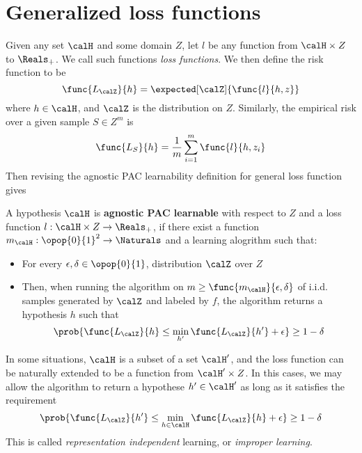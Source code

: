 \section{Generalized loss functions}
Given any set \(\calH\) and some domain \(Z\), let \(l\) be any function from \(\calH \times Z\) to \(\Reals_+\). We call such functions \textit{loss functions}. We then define the risk function to be
\begin{equation*}
    \func{L_{\calZ}}{h} = \expected[\calZ]{\func{l}{h,z}}
\end{equation*}
where \(h \in \calH\), and \(\calZ\) is the distribution on \(Z\). Similarly, the empirical risk over a given sample \(S \in Z^m\) is 
\begin{equation*}
    \func{L_S}{h} = \dfrac{1}{m} \sum_{i = 1}^m \func{l}{h,z_i}
\end{equation*}
Then revising the agnostic PAC learnability definition for general loss function gives 
\begin{definition}
    A hypothesis \(\calH\) is \textbf{agnostic PAC learnable} with respect to \(Z\) and a loss function \(l:\calH \times Z \to \Reals_+\), if there exist a function \(m_{\calH} : \opop{0}{1}^2 \to \Naturals\) and a learning alogrithm such that:
    \begin{itemize}
        \item For every \(\epsilon,\delta \in \opop{0}{1}\), distribution \(\calZ\) over \(Z\)
        \item Then, when running the algorithm on \(m \geq \func{m_{\calH}}{\epsilon,\delta}\) of i.i.d. samples generated by \(\calZ\) and labeled by \(f\), the algorithm returns a hypothesis \(h\) such that 
        \begin{equation*}
            \prob{\func{L_{\calZ}}{h} \leq \min_{h'} \func{L_{\calZ}}{h'} + \epsilon} \geq 1- \delta
        \end{equation*}
    \end{itemize}
\end{definition}

\begin{remark}
    In some situations, \(\calH\) is a subset of a set \(\calH'\), and the loss function can be naturally extended to be a function from \(\calH' \times Z\). In this cases, we may allow the algorithm to return a hypothese \(h' \in \calH'\) as long as it satisfies the requirement 
    \begin{equation*}
        \prob{\func{L_{\calZ}}{h'} \leq \min_{h \in \calH} \func{L_{\calZ}}{h} + \epsilon} \geq 1- \delta
    \end{equation*}
    This is called \textit{representation independent} learning, or \textit{improper learning}.
\end{remark}
